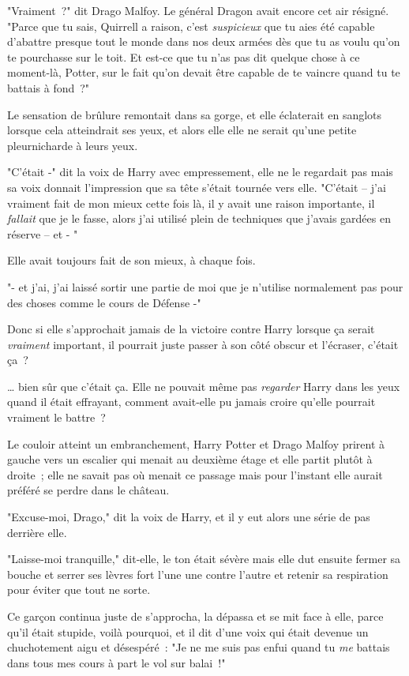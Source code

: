 "Vraiment~?" dit Drago Malfoy. Le général Dragon avait encore cet air résigné. "Parce que tu sais, Quirrell a raison, c'est \emph{suspicieux} que tu aies été capable d'abattre presque tout le monde dans nos deux armées dès que tu as voulu qu'on te pourchasse sur le toit. Et est-ce que tu n'as pas dit quelque chose à ce moment-là, Potter, sur le fait qu'on devait être capable de te vaincre quand tu te battais à fond~?"

Le sensation de brûlure remontait dans sa gorge, et elle éclaterait en sanglots lorsque cela atteindrait ses yeux, et alors elle elle ne serait qu'une petite pleurnicharde à leurs yeux.

"C'était -" dit la voix de Harry avec empressement, elle ne le regardait pas mais sa voix donnait l'impression que sa tête s'était tournée vers elle. "C'était -- j'ai vraiment fait de mon mieux cette fois là, il y avait une raison importante, il \emph{fallait} que je le fasse, alors j'ai utilisé plein de techniques que j'avais gardées en réserve -- et - "

Elle avait toujours fait de son mieux, à chaque fois.

"- et j'ai, j'ai laissé sortir une partie de moi que je n'utilise normalement pas pour des choses comme le cours de Défense -"

Donc si elle s'approchait jamais de la victoire contre Harry lorsque ça serait \emph{vraiment} important, il pourrait juste passer à son côté obscur et l'écraser, c'était ça~?

… bien sûr que c'était ça. Elle ne pouvait même pas \emph{regarder} Harry dans les yeux quand il était effrayant, comment avait-elle pu jamais croire qu'elle pourrait vraiment le battre~?

Le couloir atteint un embranchement, Harry Potter et Drago Malfoy prirent à gauche vers un escalier qui menait au deuxième étage et elle partit plutôt à droite~; elle ne savait pas où menait ce passage mais pour l'instant elle aurait préféré se perdre dans le château.

"Excuse-moi, Drago," dit la voix de Harry, et il y eut alors une série de pas derrière elle.

"Laisse-moi tranquille," dit-elle, le ton était sévère mais elle dut ensuite fermer sa bouche et serrer ses lèvres fort l'une une contre l'autre et retenir sa respiration pour éviter que tout ne sorte.

Ce garçon continua juste de s'approcha, la dépassa et se mit face à elle, parce qu'il était stupide, voilà pourquoi, et il dit d'une voix qui était devenue un chuchotement aigu et désespéré~: "Je ne me suis pas enfui quand tu \emph{me} battais dans tous mes cours à part le vol sur balai~!"

